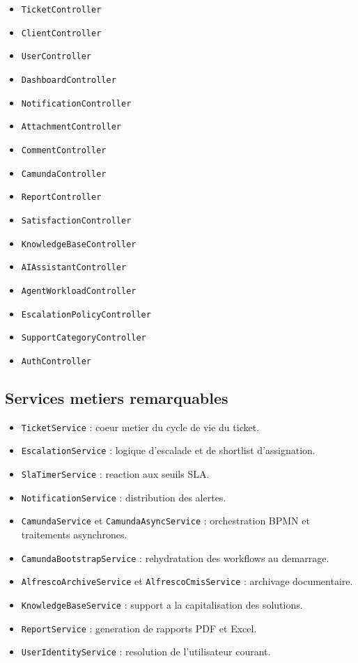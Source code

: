 \documentclass[12pt,a4paper]{article}
\begin{document}
\begin{itemize}[leftmargin=1.2cm]
  \item \texttt{TicketController}
  \item \texttt{ClientController}
  \item \texttt{UserController}
  \item \texttt{DashboardController}
  \item \texttt{NotificationController}
  \item \texttt{AttachmentController}
  \item \texttt{CommentController}
  \item \texttt{CamundaController}
  \item \texttt{ReportController}
  \item \texttt{SatisfactionController}
  \item \texttt{KnowledgeBaseController}
  \item \texttt{AIAssistantController}
  \item \texttt{AgentWorkloadController}
  \item \texttt{EscalationPolicyController}
  \item \texttt{SupportCategoryController}
  \item \texttt{AuthController}
\end{itemize}

\subsection{Services metiers remarquables}

\begin{itemize}[leftmargin=1.2cm]
  \item \texttt{TicketService} : coeur metier du cycle de vie du ticket.
  \item \texttt{EscalationService} : logique d'escalade et de shortlist d'assignation.
  \item \texttt{SlaTimerService} : reaction aux seuils SLA.
  \item \texttt{NotificationService} : distribution des alertes.
  \item \texttt{CamundaService} et \texttt{CamundaAsyncService} : orchestration BPMN et traitements asynchrones.
  \item \texttt{CamundaBootstrapService} : rehydratation des workflows au demarrage.
  \item \texttt{AlfrescoArchiveService} et \texttt{AlfrescoCmisService} : archivage documentaire.
  \item \texttt{KnowledgeBaseService} : support a la capitalisation des solutions.
  \item \texttt{ReportService} : generation de rapports PDF et Excel.
  \item \texttt{UserIdentityService} : resolution de l'utilisateur courant.
\end{itemize}
\end{document}
